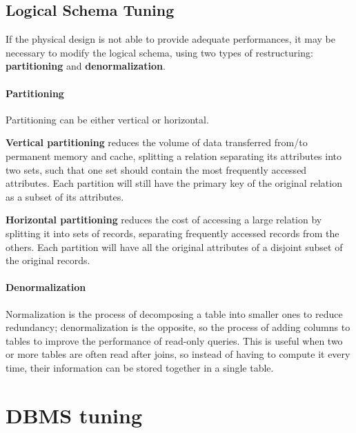 \subsection{Logical Schema Tuning}

If the physical design is not able to provide adequate performances, it may be necessary to modify the logical schema, using two types of restructuring: \textbf{partitioning} and \textbf{denormalization}.

\paragraph{Partitioning}

Partitioning can be either vertical or horizontal.

\textbf{Vertical partitioning} reduces the volume of data transferred from/to permanent memory and cache, splitting a relation separating its attributes into two sets, such that one set should contain the most frequently accessed attributes. Each partition will still have the primary key of the original relation as a subset of its attributes.

\textbf{Horizontal partitioning} reduces the cost of accessing a large relation by splitting it into sets of records, separating frequently accessed records from the others. Each partition will have all the original attributes of a disjoint subset of the original records.

\paragraph{Denormalization}

Normalization is the process of decomposing a table into smaller ones to reduce redundancy; denormalization is the opposite, so the process of adding columns to tables to improve the performance of read-only queries. This is useful when two or more tables are often read after joins, so instead of having to compute it every time, their information can be stored together in a single table.

\section{DBMS tuning}

